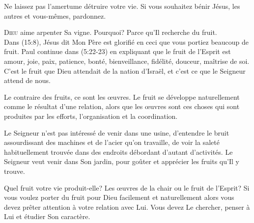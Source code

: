 Ne laissez pas l'amertume détruire votre vie.
 Si vous souhaitez bénir Jésus, les autres et vous-mêmes, pardonnez.

\dvrule







\lettrine{D}{ieu} aime arpenter Sa vigne.
 Pourquoi? Parce qu'Il recherche du fruit. \\[1ex]
Dans (15:8), Jésus dit\frcolon{} 
 \Og Mon Père est glorifié en ceci\frcolon{} que vous portiez beaucoup de fruit. \Fg{}
 Paul continue dans (5:22-23) en expliquant que le fruit
 de l'Esprit est \Og amour, joie, paix, patience, bonté, bienveillance,
 fidélité, douceur, maîtrise de soi. \Fg{}
 C'est le fruit que Dieu attendait de la nation d'Israël,
 et c'est ce que le Seigneur attend de nous.


Le contraire des fruits, ce sont les \oe{}uvres.
 Le fruit se développe naturellement comme le résultat d'une relation,
 alors que les \oe{}uvres sont ces choses qui sont produites par les efforts,
 l'organisation et la coordination.

Le Seigneur n'est pas intéressé de venir dans une usine,
 d'entendre le bruit assourdissant des machines et de l'acier qu'on travaille,
 de voir la saleté habituellement trouvée dans des endroits
 débordant d'autant  d'activités.
 Le Seigneur veut venir dans Son jardin, pour goûter et apprécier
 les fruits qu'Il y trouve.

Quel fruit votre vie produit-elle? Les \oe{}uvres de la chair
 ou le fruit de l'Esprit? Si vous voulez porter du fruit pour Dieu
 \ocadr facilement et naturellement \fcadr{} alors vous devez prêter
 attention à votre relation avec Lui. Vous devez Le chercher,
 penser à Lui et étudier Son caractère.

